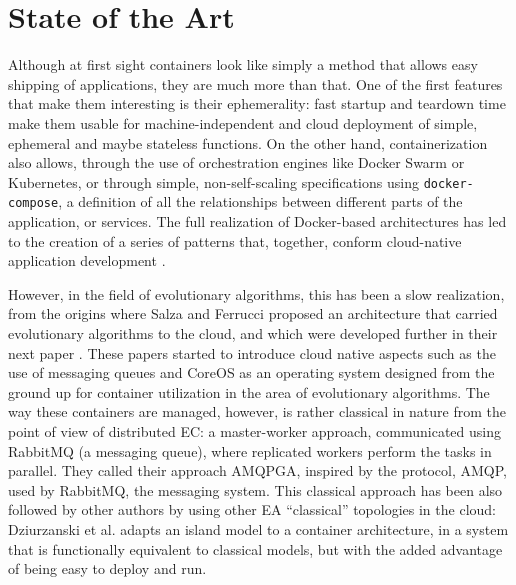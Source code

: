 \documentclass[review]{elsarticle}
\begin{document}
\section{State of the Art} 
\label{soa}

Although at first sight containers look like simply a method that
allows easy shipping of applications, they are much more than
that. One of the first features that make them interesting is their
ephemerality: fast startup and teardown time make them usable for
machine-independent and cloud deployment of simple, ephemeral and
maybe stateless functions. On the other hand, containerization also
allows, through the use of orchestration engines like Docker Swarm or
Kubernetes, or through simple, non-self-scaling specifications using
{\tt docker-compose}, a definition of all the relationships between
different parts of the application, or services. The full realization
of Docker-based architectures has led to the creation of a series of
patterns that, together, conform cloud-native application development
\cite{kratzke2017understanding}.

However, in the field of evolutionary algorithms, this has been a slow
realization, from the origins where Salza and Ferrucci
\cite{salza2016approach,salza2016develop} proposed an architecture
that carried evolutionary algorithms to the cloud, and which were
developed further in their next paper \cite{de2017parallel}. These
papers started to introduce cloud native aspects such as the use of
messaging queues and CoreOS as an operating system designed from the
ground up for container utilization in the area of evolutionary
algorithms. The way these containers are managed, however, is rather
classical in nature from the point of view of distributed EC: a
master-worker approach, communicated using RabbitMQ (a messaging
queue), where replicated workers perform the tasks in parallel. They
called their approach AMQPGA, inspired by the protocol, AMQP, used by
RabbitMQ, the messaging system. This classical approach has been also
followed by other authors by using other EA ``classical'' topologies
in the cloud: Dziurzanski et al. \cite{dziurzanski2020scalable} adapts an island model to
a container architecture, in a system that is functionally equivalent
to classical models, but with the added advantage of being easy to
deploy and run.
\end{document}
